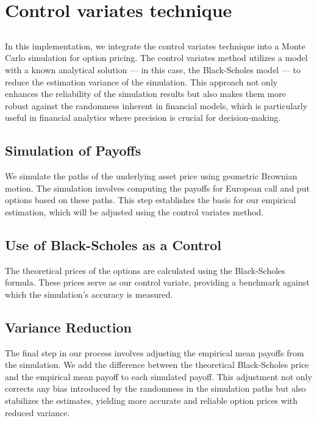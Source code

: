 \documentclass{article}
\begin{document}
\newpage
\section{Control variates technique}


\subsection*{}
In this implementation, we integrate the control variates technique into a Monte Carlo simulation for option pricing. The control variates method utilizes a model with a known analytical solution --- in this case, the Black-Scholes model --- to reduce the estimation variance of the simulation. This approach not only enhances the reliability of the simulation results but also makes them more robust against the randomness inherent in financial models, which is particularly useful in financial analytics where precision is crucial for decision-making.


\subsection*{Simulation of Payoffs}
We simulate the paths of the underlying asset price using geometric Brownian motion. The simulation involves computing the payoffs for European call and put options based on these paths. This step establishes the basis for our empirical estimation, which will be adjusted using the control variates method.

\subsection*{Use of Black-Scholes as a Control}
The theoretical prices of the options are calculated using the Black-Scholes formula. These prices serve as our control variate, providing a benchmark against which the simulation's accuracy is measured.

\subsection*{Variance Reduction}
The final step in our process involves adjusting the empirical mean payoffs from the simulation. We add the difference between the theoretical Black-Scholes price and the empirical mean payoff to each simulated payoff. This adjustment not only corrects any bias introduced by the randomness in the simulation paths but also stabilizes the estimates, yielding more accurate and reliable option prices with reduced variance.
\end{document}
